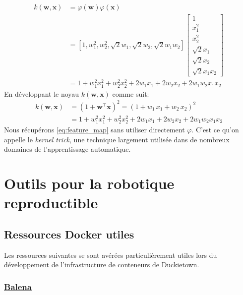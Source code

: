 \begin{align}\label{eq:feature_map}
    k(\mathbf w, \mathbf x) &= \varphi(\mathbf w) \varphi(\mathbf x) \\
    &=[1, w_1^2, w_2^2, \sqrt{2} w_1, \sqrt{2} w_2, \sqrt{2} w_1 w_2]\begin{bmatrix}
                                                                                   1\\ x_1^2\\ x_2^2\\ \sqrt{2} x_1\\ \sqrt{2} x_2\\ \sqrt{2} x_1 x_2
    \end{bmatrix}\\
    & = \boxed{1 + w_1^2 x_1^2 + w_2^2 x_2^2 + 2 w_1 x_1 + 2 w_2 x_2 + 2 w_1 w_2 x_1 x_2}
\end{align}
%
En développant le noyau $k(\mathbf w, \mathbf x)$ comme suit:
%
\begin{align}
k(\mathbf w, \mathbf x) & = (1 + \mathbf w^\intercal \mathbf x)^2 = (1 + w_1 \, x_1 + w_2 \, x_2)^2 \\
& = \boxed{1 + w_1^2 x_1^2 + w_2^2 x_2^2 + 2 w_1 x_1 + 2 w_2 x_2 + 2 w_1 w_2 x_1 x_2}
\end{align}
%
Nous récupérons \autoref{eq:feature_map} sans utiliser directement $\varphi$. C'est ce qu'on appelle le \textit{kernel trick}, une technique largement utilisée dans de nombreux domaines de l'apprentissage automatique.

\chapter{Outils pour la robotique reproductible}

\section{Ressources Docker utiles}

Les ressources suivantes se sont avérées particulièrement utiles lors du développement de l'infrastructure de conteneurs de Duckietown.

\subsection{\href{https://www.balena.io/}{Balena}}\label{subsec:balena}

